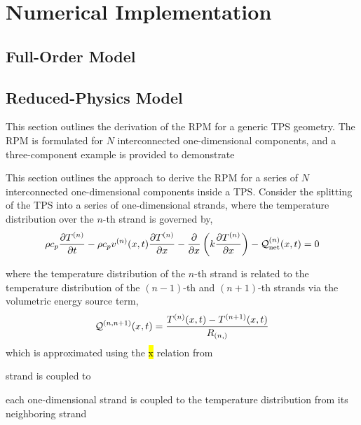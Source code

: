 \appendix

\section{Numerical Implementation}\label{app_implementation}

\subsection{Full-Order Model}

\subsection{Reduced-Physics Model}

This section outlines the derivation of the RPM for a generic TPS geometry. The RPM is formulated for $N$ interconnected one-dimensional components, and a three-component example is provided to demonstrate 

This section outlines the approach to derive the RPM for a series of $N$ interconnected one-dimensional components inside a TPS. Consider the splitting of the TPS into a series of one-dimensional strands, where the temperature distribution over the $n$-th strand is governed by,
\begin{equation}
    \rho c_p\frac{\partial T^{(n)}}{\partial t} - \rho c_p v^{(n)}(x,t)\frac{\partial T^{(n)}}{\partial x} - \frac{\partial}{\partial x}\left(k\frac{\partial T^{(n)}}{\partial x}\right) - \mathcal{Q}^{(n)}_{\text{net}}(x,t) = 0
\end{equation}



where the temperature distribution of the $n$-th strand is related to the temperature distribution of the $(n-1)$-th and $(n+1)$-th strands via the volumetric energy source term,
\begin{equation}
    \mathcal{Q}^{(n,n+1)}(x,t) = \frac{T^{(n)}(x,t) - T^{(n+1)}(x,t)}{R_{(n,)}}
\end{equation}
which is approximated using the \hl{x} relation from 

strand is coupled to 

each one-dimensional strand is coupled to the temperature distribution from its neighboring strand 

